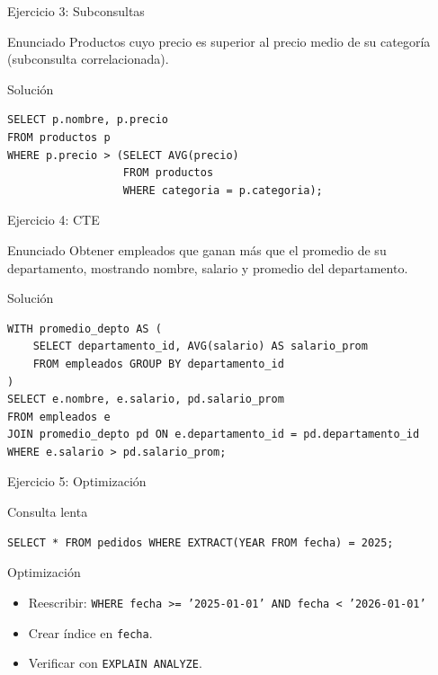 \documentclass[aspectratio=169, 10pt, xcolor=table]{beamer}
\begin{document}
\begin{frame}[fragile]{Ejercicio 3: Subconsultas}
    \begin{block}{Enunciado}
        Productos cuyo precio es superior al precio medio de su categoría (subconsulta correlacionada).
    \end{block}
    \begin{block}{Solución}
        \begin{lstlisting}
SELECT p.nombre, p.precio
FROM productos p
WHERE p.precio > (SELECT AVG(precio)
                  FROM productos
                  WHERE categoria = p.categoria);
        \end{lstlisting}
    \end{block}
\end{frame}

\begin{frame}[fragile]{Ejercicio 4: CTE}
    \begin{block}{Enunciado}
        Obtener empleados que ganan más que el promedio de su departamento, mostrando nombre, salario y promedio del departamento.
    \end{block}
    \begin{block}{Solución}
        \begin{lstlisting}
WITH promedio_depto AS (
    SELECT departamento_id, AVG(salario) AS salario_prom
    FROM empleados GROUP BY departamento_id
)
SELECT e.nombre, e.salario, pd.salario_prom
FROM empleados e
JOIN promedio_depto pd ON e.departamento_id = pd.departamento_id
WHERE e.salario > pd.salario_prom;
        \end{lstlisting}
    \end{block}
\end{frame}

\begin{frame}[fragile]{Ejercicio 5: Optimización}
    \begin{block}{Consulta lenta}
        \begin{verbatim}
SELECT * FROM pedidos WHERE EXTRACT(YEAR FROM fecha) = 2025;
        \end{verbatim}
    \end{block}
    \begin{block}{Optimización}
        \begin{itemize}
            \item Reescribir: \texttt{WHERE fecha >= '2025-01-01' AND fecha < '2026-01-01'}
            \item Crear índice en \texttt{fecha}.
            \item Verificar con \texttt{EXPLAIN ANALYZE}.
        \end{itemize}
    \end{block}
\end{frame}
\end{document}
